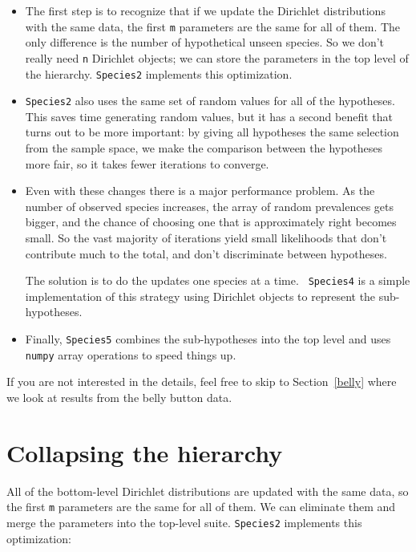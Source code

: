 \documentclass[12pt]{book}
\begin{document}
\begin{itemize}

\item The first step is to recognize that if we update the Dirichlet
  distributions with the same data, the first {\tt m} parameters are
  the same for all of them.  The only difference is the number of
  hypothetical unseen species.  So we don't really need {\tt n}
  Dirichlet objects; we can store the parameters in the top level of
  the hierarchy.  {\tt Species2} implements this optimization.

\item {\tt Species2} also uses the same set of random values for all
  of the hypotheses.  This saves time generating random values, but it
  has a second benefit that turns out to be more important: by giving
  all hypotheses the same selection from the sample space, we make
  the comparison between the hypotheses more fair, so it takes
  fewer iterations to converge.

\item Even with these changes there is a major performance problem.
  As the number of observed species increases, the array of random
  prevalences gets bigger, and the chance of choosing one that is
  approximately right becomes small.  So the vast majority of
  iterations yield small likelihoods that don't contribute much to the
  total, and don't discriminate between hypotheses.

  The solution is to do the updates one species at a time.  {\tt
  Species4} is a simple implementation of this strategy using
  Dirichlet objects to represent the sub-hypotheses.

\item Finally, {\tt Species5} combines the sub-hypotheses into the top
  level and uses {\tt numpy} array operations to speed things up.

\end{itemize}

If you are not interested in the details, feel free to skip to
Section~\ref{belly} where we look at results from the belly
button data.


\section{Collapsing the hierarchy}
\label{collapsing}

All of the bottom-level Dirichlet distributions are updated
with the same data, so the first {\tt m} parameters are the same for
all of them.  
We can eliminate them and merge the parameters into
the top-level suite.  {\tt Species2} implements this optimization:
\end{document}
